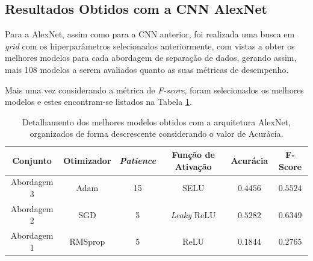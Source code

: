\subsection{Resultados Obtidos com a CNN AlexNet}
\label{sec:alexnet}

 Para a AlexNet, assim como para a CNN anterior, foi realizada uma busca em \emph{grid} com os hiperparâmetros selecionados anteriormente, com vistas a obter os melhores modelos para cada abordagem de separação de dados, gerando assim, mais 108 modelos a serem avaliados quanto as suas métricas de desempenho.

 Mais uma vez considerando a métrica de \emph{F-score}, foram selecionados os melhores modelos e estes encontram-se listados na Tabela \ref{tab:alexnet}.

 \begin{table}[h!]
 \centering
 \caption{Detalhamento dos melhores modelos obtidos com a arquitetura AlexNet, organizados de forma descrescente considerando o valor de Acurácia.}
 \label{tab:alexnet}
 \begin{tabular}{cccccc}
 \toprule
 \textbf{Conjunto} & \textbf{Otimizador} & \textbf{\emph{Patience}}  & \textbf{Função de Ativação} & \textbf{Acurácia} & \textbf{F-Score} \\
 \midrule
 Abordagem 3 & Adam & 15 & SELU & $0.4456$ & $0.5524$ \\
 Abordagem 2 & SGD & 5 & \emph{Leaky} ReLU & $0.5282$ & $0.6349$ \\
 Abordagem 1 & RMSprop & 5 & ReLU & $0.1844$ & $0.2765$ \\
 \bottomrule
 \end{tabular}
\end{table}


